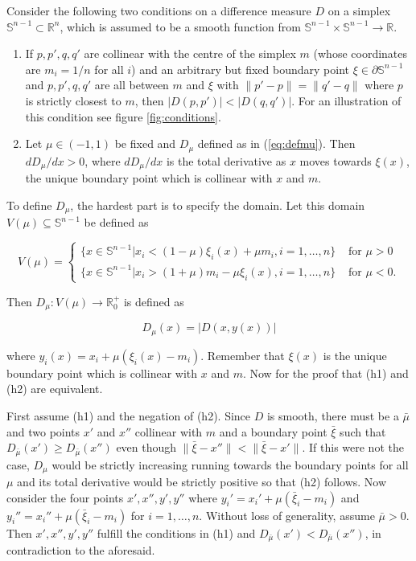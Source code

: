 \documentclass[11pt]{article}
\begin{document}
Consider the following two conditions on a difference measure $D$ on a
simplex $\mathbb{S}^{n-1}\subset{}\mathbb{R}^{n}$, which is assumed to
be a smooth function from
$\mathbb{S}^{n-1}\times\mathbb{S}^{n-1}\rightarrow{}\mathbb{R}$.

\begin{enumerate}[(h1)]
\item If $p,p',q,q'$ are collinear with the centre of the
  simplex $m$ (whose coordinates are $m_{i}=1/n$ for all $i$) and an
  arbitrary but fixed boundary point $\xi\in\partial\mathbb{S}^{n-1}$
  and $p,p',q,q'$ are all between $m$ and $\xi$ with
  $\|p'-p\|=\|q'-q\|$ where $p$ is strictly closest to $m$, then
  $|D(p,p')|<|D(q,q')|$. For an illustration of this condition see
  figure \ref{fig:conditions}.
\item Let $\mu\in(-1,1)$ be fixed and $D_{\mu}$ defined as in
  (\ref{eq:defmu}). Then $dD_{\mu}/dx>0$, where $dD_{\mu}/dx$ is the
  total derivative as $x$ moves towards $\xi(x)$, the unique boundary
  point which is collinear with $x$ and $m$.
\end{enumerate}

To define $D_{\mu}$, the hardest part is to specify the domain. Let
this domain $V(\mu)\subseteq{}\mathbb{S}^{n-1}$ be defined as

\begin{equation}
  \label{eq:defvmu}
  V(\mu)=\left\{\begin{array}{ll}
    \{x\in\mathbb{S}^{n-1}|x_{i}<(1-\mu)\xi_{i}(x)+\mu{}m_{i},i=1,\ldots,n\}&\mbox{ for }\mu>0 \\
    \{x\in\mathbb{S}^{n-1}|x_{i}>(1+\mu)m_{i}-\mu{}\xi_{i}(x),i=1,\ldots,n\}&\mbox{ for }\mu<0.
  \end{array}\right.
\end{equation}

Then $D_{\mu}:V(\mu)\rightarrow{}\mathbb{R}^{+}_{0}$ is defined as

\begin{equation}
  \label{eq:defmu}
  D_{\mu}(x)=|D(x,y(x))|
\end{equation}

where $y_{i}(x)=x_{i}+\mu(\xi_{i}(x)-m_{i})$. Remember that $\xi(x)$
is the unique boundary point which is collinear with $x$ and $m$.
Now for the proof that (h1) and (h2) are equivalent. 

First assume (h1) and the negation of (h2). Since $D$ is smooth, there
must be a $\bar{\mu}$ and two points $x'$ and $x''$ collinear with $m$
and a boundary point $\bar{\xi}$ such that
$D_{\bar{\mu}}(x')\geq{}D_{\bar{\mu}}(x'')$ even though
$\|\bar{\xi}-x''\|<\|\bar{\xi}-x'\|$. If this were not the case,
$D_{\mu}$ would be strictly increasing running towards the boundary
points for all $\mu$ and its total derivative would be strictly
positive so that (h2) follows. Now consider the four points
$x',x'',y',y''$ where $y_{i}'=x_{i}'+\mu(\bar{\xi}_{i}-m_{i})$ and
$y_{i}''=x_{i}''+\mu(\bar{\xi}_{i}-m_{i})$ for $i=1,\ldots,n$. Without
loss of generality, assume $\bar{\mu}>0$. Then $x',x'',y',y''$ fulfill
the conditions in (h1) and $D_{\bar{\mu}}(x')<{}D_{\bar{\mu}}(x'')$,
in contradiction to the aforesaid.
\end{document}

